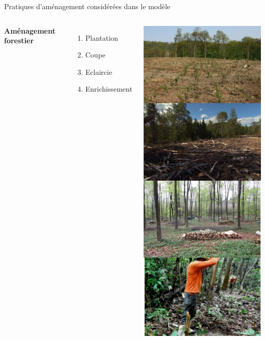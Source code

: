 \documentclass[11pt, compress, aspectratio=1610]{beamer}
\providecommand{\tightlist}{%
  \setlength{\itemsep}{0pt}\setlength{\parskip}{0pt}}
\newcommand{\begincols}{\begin{columns}}
\newcommand{\stopcols}{\end{columns}}
\begin{document}
\begin{frame}{Pratiques d’aménagement considérées dans le modèle}
\protect\hypertarget{pratiques-damuxe9nagement-considuxe9ruxe9es-dans-le-moduxe8le}{}

\begincols
{}

\textbf{Aménagement forestier}

\begin{enumerate}

    \tightlist
    \item
      Plantation
    \item
      Coupe
    \item
      Eclaircie
    \item
      Enrichissement
  \end{enumerate}

\hfill{}
    \centering

\includegraphics[scale=0.50]{figures/managPrac}

\par
\stopcols

\end{frame}
\end{document}
